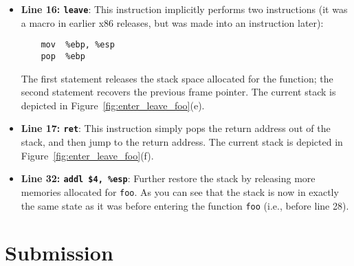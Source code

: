 \begin{itemize}
\item \textbf{Line 16: \texttt{leave}}: This
instruction implicitly performs two instructions (it was a macro
in earlier x86 releases, but was made into an instruction later):
\begin{verbatim}
    mov  %ebp, %esp
    pop  %ebp
\end{verbatim}
The first statement releases the stack space allocated for the function; 
the second statement recovers the previous frame pointer. 
The current stack is depicted in Figure~\ref{fig:enter_leave_foo}(e). 

\item \textbf{Line 17: \texttt{ret}}: This instruction simply pops the return 
address out of the stack, and then jump to the return address.
The current stack is depicted in Figure~\ref{fig:enter_leave_foo}(f).

\item \textbf{Line 32: \texttt{addl \$4, \%esp}}: Further restore the stack by
releasing more memories allocated for {\tt foo}. 
As you can see that the stack is now in exactly the same state as it was
before entering the function {\tt foo} (i.e., before line 28). 
\end{itemize}



\section{Submission}

\seedsubmission





